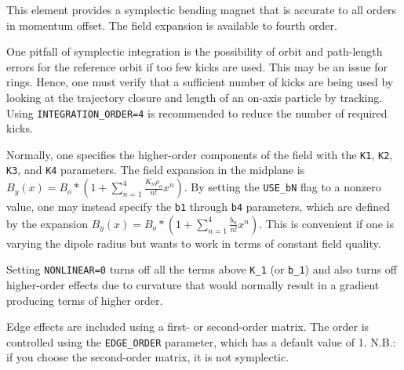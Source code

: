 This element provides a symplectic bending magnet that is accurate to
all orders in momentum offset.  The field expansion is available to
fourth order.

One pitfall of symplectic integration is the possibility of orbit and
path-length errors for the reference orbit if too few kicks are used.
This may be an issue for rings.  Hence, one must verify that a
sufficient number of kicks are being used by looking at the trajectory
closure and length of an on-axis particle by tracking.  Using 
{\tt INTEGRATION\_ORDER=4} is recommended to reduce the number of
required kicks.

Normally, one specifies the higher-order components of the field with
the {\tt K1}, {\tt K2}, {\tt K3}, and {\tt K4} parameters. The field
expansion in the midplane is $B_y(x) = B_o * (1 +
\sum_{n=1}^4\frac{K_n\rho_o}{n!}x^n)$.  By setting the {\tt USE\_bN}
flag to a nonzero value, one may instead specify the {\tt b1} through
{\tt b4} parameters, which are defined by the expansion $B_y(x) = B_o
* (1 + \sum_{n=1}^4\frac{b_n}{n!}x^n)$.  This is convenient if one is
varying the dipole radius but wants to work in terms of constant field
quality.  

Setting {\tt NONLINEAR=0} turns off all the terms above {\tt K_1} (or {\tt b_1}) and
also turns off higher-order effects due to curvature that would
normally result in a gradient producing terms of higher order.

Edge effects are included using a first- or second-order matrix.  The
order is controlled using the {\tt EDGE\_ORDER} parameter, which has a
default value of 1.  N.B.: if you choose the second-order matrix, it
is not symplectic.
